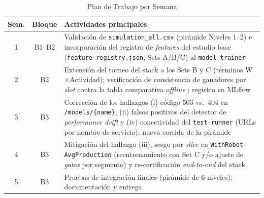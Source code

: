 \documentclass[conference]{IEEEtran}
\begin{document}
\begin{table}[H]
\caption{Plan de Trabajo por Semana}
\label{tab:plan}
\centering\small
\begin{tabular}{@{}ccp{4.5cm}@{}}
\toprule
\textbf{Sem.} & \textbf{Bloque} & \textbf{Actividades principales} \\
\midrule
1 & B1--B2 & Validación de \texttt{simulation\_all.csv} (pirámide Niveles 1--2) e incorporación del registro de \textit{features} del estudio base (\texttt{feature\_registry.json}, Sets A/B/C) al \texttt{model-trainer} \\
2 & B2 & Extensión del torneo del stack a los Sets B y C (términos W$\times$Actividad); verificación de consistencia de ganadores por \textit{slot} contra la tabla comparativa \textit{offline} \cite{garcia2026}; registro en MLflow \\
3 & B3 & Corrección de los hallazgos (i) código 503 vs.\ 404 en \texttt{/models/\{name\}}, (ii) falsos positivos del detector de \textit{performance drift} y (iv) conectividad del \texttt{test-runner} (URLs por nombre de servicio); nueva corrida de la pirámide \\
4 & B3 & Mitigación del hallazgo (iii), sesgo por \textit{slice} en \texttt{WithRobot-AvgProduction} (reentrenamiento con Set C y/o ajuste de \textit{gates} por segmento) y re-certificación \textit{end-to-end} del stack \\
5 & B3 & Pruebas de integración finales (pirámide de 6 niveles); documentación y entrega \\
\bottomrule
\end{tabular}
\end{table}
\end{document}
